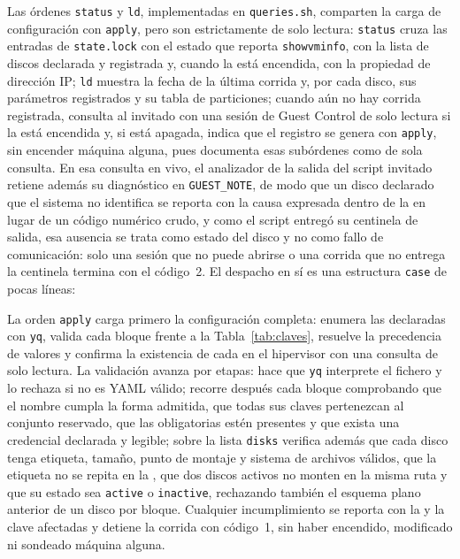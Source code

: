 Las órdenes \texttt{status} y \texttt{ld}, implementadas en \texttt{queries.sh}, comparten la carga de configuración con \texttt{apply}, pero son estrictamente de solo lectura: \texttt{status} cruza las entradas de \texttt{state.lock} con el estado que reporta \texttt{showvminfo}, con la lista de discos declarada y registrada y, cuando la \vm{} está encendida, con la propiedad de dirección IP; \texttt{ld} muestra la fecha de la última corrida y, por cada disco, sus parámetros registrados y su tabla de particiones; cuando aún no hay corrida registrada, consulta al invitado con una sesión de Guest Control de solo lectura si la \vm{} está encendida y, si está apagada, indica que el registro se genera con \texttt{apply}, sin encender máquina alguna, pues \textcite{virtualbox_vboxmanage} documenta esas subórdenes como de sola consulta. En esa consulta en vivo, el analizador de la salida del script invitado retiene además su diagnóstico en \texttt{GUEST\_NOTE}, de modo que un disco declarado que el sistema no identifica se reporta con la causa expresada dentro de la \vm{} en lugar de un código numérico crudo, y como el script entregó su centinela de salida, esa ausencia se trata como estado del disco y no como fallo de comunicación: solo una sesión que no puede abrirse o una corrida que no entrega la centinela termina con el código~2. El despacho en sí es una estructura \texttt{case} de pocas líneas:



La orden \texttt{apply} carga primero la configuración completa: enumera las \vm{} declaradas con \texttt{yq}, valida cada bloque frente a la Tabla~\ref{tab:claves}, resuelve la precedencia de valores y confirma la existencia de cada \vm{} en el hipervisor con una consulta de solo lectura. La validación avanza por etapas: hace que \texttt{yq} interprete el fichero y lo rechaza si no es YAML válido; recorre después cada bloque comprobando que el nombre cumpla la forma admitida, que todas sus claves pertenezcan al conjunto reservado, que las obligatorias estén presentes y que exista una credencial declarada y legible; sobre la lista \texttt{disks} verifica además que cada disco tenga etiqueta, tamaño, punto de montaje y sistema de archivos válidos, que la etiqueta no se repita en la \vm{}, que dos discos activos no monten en la misma ruta y que su estado sea \texttt{active} o \texttt{inactive}, rechazando también el esquema plano anterior de un disco por bloque. Cualquier incumplimiento se reporta con la \vm{} y la clave afectadas y detiene la corrida con código~1, sin haber encendido, modificado ni sondeado máquina alguna.

